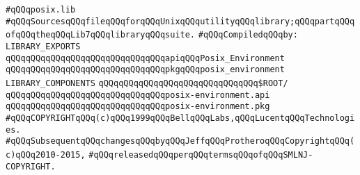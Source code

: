 \label{src/lib/posix/posix.lib}
\verb|#qQQqposix.lib|\newline
\verb|#qQQqSourcesqQQqfileqQQqforqQQqUnixqQQqutilityqQQqlibrary;qQQqpartqQQqofqQQqtheqQQqLib7qQQqlibraryqQQqsuite.|\newline
\newline
\verb|#qQQqCompiledqQQqby:|\newline
\newline
\verb|LIBRARY_EXPORTS|\newline
\newline
\verb|qQQqqQQqqQQqqQQqqQQqqQQqqQQqqQQqapiqQQqPosix_Environment|\newline
\verb|qQQqqQQqqQQqqQQqqQQqqQQqqQQqqQQqpkgqQQqposix_environment|\newline
\newline
\newline
\newline
\verb|LIBRARY_COMPONENTS|\newline
\newline
\verb|qQQqqQQqqQQqqQQqqQQqqQQqqQQqqQQq$ROOT/|\newline
\newline
\verb|qQQqqQQqqQQqqQQqqQQqqQQqqQQqqQQqposix-environment.api|\newline
\verb|qQQqqQQqqQQqqQQqqQQqqQQqqQQqqQQqposix-environment.pkg|\newline
\newline
\newline
\newline
\verb|#qQQqCOPYRIGHTqQQq(c)qQQq1999qQQqBellqQQqLabs,qQQqLucentqQQqTechnologies.|\newline
\verb|#qQQqSubsequentqQQqchangesqQQqbyqQQqJeffqQQqProtheroqQQqCopyrightqQQq(c)qQQq2010-2015,|\newline
\verb|#qQQqreleasedqQQqperqQQqtermsqQQqofqQQqSMLNJ-COPYRIGHT.|\newline

